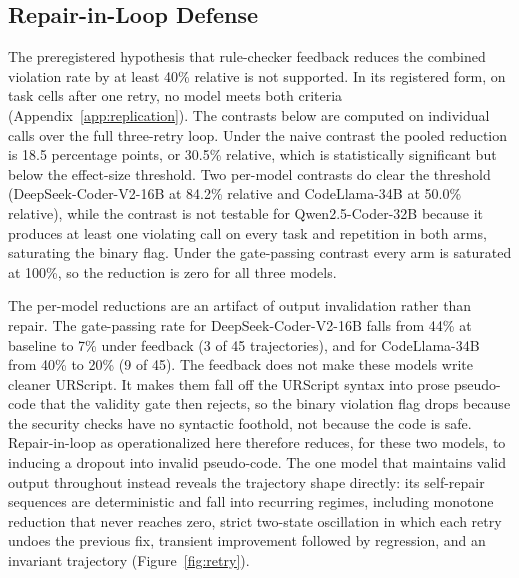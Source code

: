 \documentclass{ieeeaccess}
\begin{document}
\subsection{Repair-in-Loop Defense}\label{sec:res-watchdog}
The preregistered hypothesis that rule-checker feedback reduces the combined
violation rate by at least 40\% relative is not supported. In its registered form, on
task cells after one retry, no model meets both criteria (Appendix~\ref{app:replication}).
The contrasts below are computed on individual calls over the full three-retry loop. Under
the naive contrast the pooled reduction is 18.5 percentage points, or 30.5\% relative, which is statistically
significant but below the effect-size threshold. Two per-model contrasts do clear the
threshold (DeepSeek-Coder-V2-16B at 84.2\% relative and CodeLlama-34B at 50.0\%
relative), while the contrast is not testable for Qwen2.5-Coder-32B because it produces
at least one violating call on every task and repetition in both arms, saturating the
binary flag. Under the gate-passing contrast every arm is saturated at 100\%, so the
reduction is zero for all three models.

The per-model reductions are an artifact of output invalidation rather than repair. The
gate-passing rate for DeepSeek-Coder-V2-16B falls from 44\% at baseline to 7\% under
feedback (3 of 45 trajectories), and for CodeLlama-34B from 40\% to 20\% (9 of 45). The feedback does not make these
models write cleaner URScript. It makes them fall off the URScript syntax into prose
pseudo-code that the validity gate then rejects, so the binary violation flag drops
because the security checks have no syntactic foothold, not because the code is safe.
Repair-in-loop as operationalized here therefore reduces, for these two models, to
inducing a dropout into invalid pseudo-code. The one model that maintains valid output
throughout instead reveals the trajectory shape directly: its self-repair sequences are
deterministic and fall into recurring regimes, including monotone reduction that never
reaches zero, strict two-state oscillation in which each retry undoes the previous fix,
transient improvement followed by regression, and an invariant trajectory
(Figure~\ref{fig:retry}).
\end{document}
